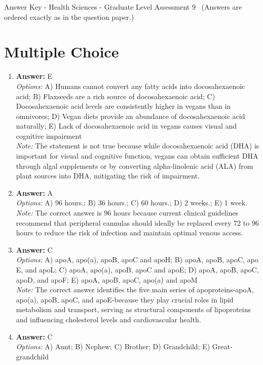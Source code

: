 \documentclass[12pt]{article}
\begin{document}
\begin{center}
Answer Key - Health Sciences - Graduate Level Assessment 9 \
\small (Answers are ordered exactly as in the question paper.)
\end{center}

\section*{Multiple Choice}
\begin{enumerate}[label=\arabic*.]
\item \textbf{Answer:} E
\\ \textit{Options:} A) Humans cannot convert any fatty acids into docosahexaenoic acid; B) Flaxseeds are a rich source of docosahexaenoic acid; C) Docosahexaenoic acid levels are consistently higher in vegans than in omnivores; D) Vegan diets provide an abundance of docosahexaenoic acid naturally; E) Lack of docosahexaenoic acid in vegans causes visual and cognitive impairment
\\ \textit{Note:} The statement is not true because while docosahexaenoic acid (DHA) is important for visual and cognitive function, vegans can obtain sufficient DHA through algal supplements or by converting alpha-linolenic acid (ALA) from plant sources into DHA, mitigating the risk of impairment.
\item \textbf{Answer:} A
\\ \textit{Options:} A) 96 hours.; B) 36 hours.; C) 60 hours.; D) 2 weeks.; E) 1 week.
\\ \textit{Note:} The correct answer is 96 hours because current clinical guidelines recommend that peripheral cannulas should ideally be replaced every 72 to 96 hours to reduce the risk of infection and maintain optimal venous access.
\item \textbf{Answer:} C
\\ \textit{Options:} A) apoA, apo(a), apoB, apoC and apoH; B) apoA, apoB, apoC, apo E, and apoL; C) apoA, apo(a), apoB, apoC and apoE; D) apoA, apoB, apoC, apoD, and apoF; E) apoA, apoB, apoC, apo(a) and apoM
\\ \textit{Note:} The correct answer identifies the five main series of apoproteins-apoA, apo(a), apoB, apoC, and apoE-because they play crucial roles in lipid metabolism and transport, serving as structural components of lipoproteins and influencing cholesterol levels and cardiovascular health.
\item \textbf{Answer:} C
\\ \textit{Options:} A) Aunt; B) Nephew; C) Brother; D) Grandchild; E) Great-grandchild

\end{enumerate}
\end{document}
